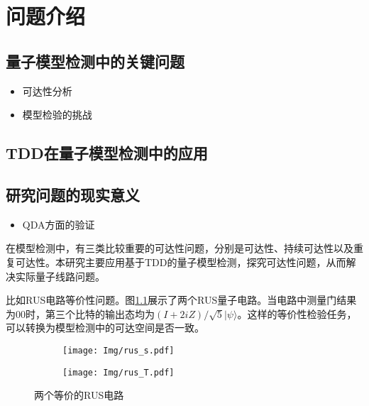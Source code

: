 \chapter{问题介绍}

\section{量子模型检测中的关键问题}
\begin{itemize}
  \item 可达性分析
  \item 模型检验的挑战
\end{itemize}

\section{TDD在量子模型检测中的应用}

\section{研究问题的现实意义}
\begin{itemize}
  \item QDA方面的验证
\end{itemize}
在模型检测中，有三类比较重要的可达性问题，分别是可达性、持续可达性以及重复可达性。本研究主要应用基于TDD的量子模型检测，探究可达性问题，从而解决实际量子线路问题。

比如RUS电路等价性问题。图\ref{fig:rus-equal}展示了两个RUS量子电路。当电路中测量门结果为$00$时，第三个比特的输出态均为$\left(I+2iZ\right)/ \sqrt 5 |\psi\rangle$。这样的等价性检验任务，可以转换为模型检测中的可达空间是否一致。
\begin{figure}[!htbp]
	\centering
	\begin{subfigure}[b]{0.4\textwidth}
        \centering
        \texttt{[image: Img/rus\_s.pdf]}
	\end{subfigure}
	\qquad
	\begin{subfigure}[b]{0.4\textwidth}
        \centering
        \texttt{[image: Img/rus\_T.pdf]}
	\end{subfigure}
	\caption{两个等价的RUS电路\citep{Bocharov_2015}}
	\label{fig:rus-equal}
\end{figure}
